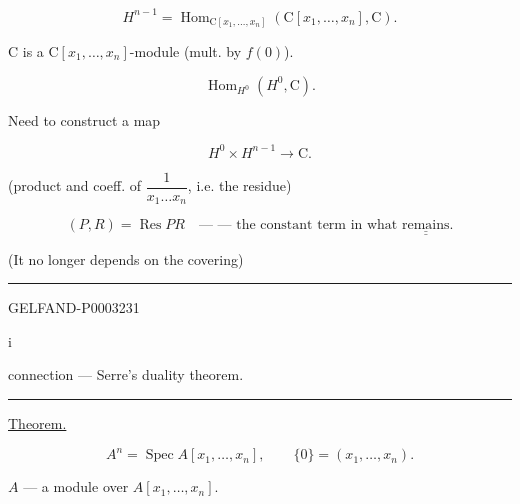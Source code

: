 \begin{equation*}H^{n-1}=\operatorname{Hom}_{\mathrm C[x_1,\ldots, x_n]}(\mathrm C[x_1,\ldots, x_n],\mathrm C).\end{equation*}

$\mathrm C$ is a $\mathrm C[x_1,\ldots, x_n]$-module (mult. by $f (0)$).

\begin{equation*}\operatorname{Hom}_{H^0}(H^0,\mathrm C).\end{equation*}

Need to construct a map

\begin{equation*}H^0\times H^{n-1}\longrightarrow\mathrm C.\end{equation*}

(product and coeff. of $\dfrac1{x_1\ldots x_n}$, i.e. the residue)

\begin{equation*}(P, R)=\operatorname{Res}PR\quad\text{--- --- the constant term in what }\underline{\underline{\text{remains}}}.\end{equation*}

(It no longer depends on the covering)

\begin{center}\rule{.95\linewidth}{.3pt}\end{center}

\begin{GelfandAdjacentEvidence}{GELFAND-P000323}{1}
\begin{center}$\mathrm i$\end{center}

\end{GelfandAdjacentEvidence}


connection --- Serre’s duality theorem.

\begin{center}\rule{.95\linewidth}{.3pt}\end{center}

\uline{Theorem.}

\begin{equation*}A^n=\operatorname{Spec} A[x_1,\ldots, x_n],\qquad\{0\}=(x_1,\ldots, x_n).\end{equation*}

$A$ --- a module over $A[x_1,\ldots, x_n]$.

